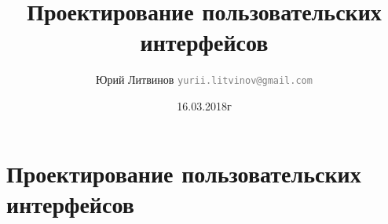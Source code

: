 \documentclass[xetex,mathserif,serif]{beamer}
\title{Проектирование пользовательских интерфейсов}
\author[Юрий Литвинов]{Юрий Литвинов \newline \textcolor{gray}{\small\texttt{yurii.litvinov@gmail.com}}}
\date{16.03.2018г}
\begin{document}
	
	\frame{\titlepage}




	\section{Проектирование пользовательских интерфейсов}
\end{document}
